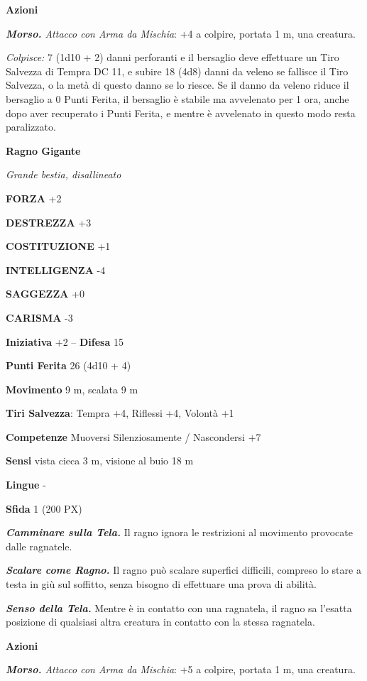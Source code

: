 \begin{multicols}{2}
	\textbf{Azioni}

	\textit{\textbf{Morso.} Attacco con Arma da Mischia}: +4 a colpire, portata 1 m, una creatura.

	\textit{Colpisce:} 7 (1d10 + 2) danni perforanti e il bersaglio deve effettuare un Tiro Salvezza di Tempra DC 11, e subire 18 (4d8) danni da veleno se fallisce il Tiro Salvezza, o la metà di questo danno se lo riesce. Se il danno da veleno riduce il bersaglio a 0 Punti Ferita, il bersaglio è stabile ma avvelenato per 1 ora, anche dopo aver recuperato i Punti Ferita, e mentre è avvelenato in questo modo resta paralizzato.

	\medskip\textbf{Ragno Gigante}

	\textit{Grande bestia, disallineato}

	\textbf{FORZA} +2

	\textbf{DESTREZZA} +3

	\textbf{COSTITUZIONE} +1

	\textbf{INTELLIGENZA} -4

	\textbf{SAGGEZZA} +0

	\textbf{CARISMA} -3

	\textbf{Iniziativa} +2 -- \textbf{Difesa} 15

	\textbf{Punti Ferita} 26 (4d10 + 4)

	\textbf{Movimento} 9 m, scalata 9 m

	\textbf{Tiri Salvezza}: Tempra +4, Riflessi +4, Volontà +1

	\textbf{Competenze} Muoversi Silenziosamente / Nascondersi +7

	\textbf{Sensi} vista cieca 3 m, visione al buio 18 m

	\textbf{Lingue} -

	\textbf{Sfida} 1 (200 PX)

	\textit{\textbf{Camminare sulla Tela.}} Il ragno ignora le restrizioni al movimento provocate dalle ragnatele.

	\textit{\textbf{Scalare come Ragno.}} Il ragno può scalare superfici difficili, compreso lo stare a testa in giù sul soffitto, senza bisogno di effettuare una prova di abilità.

	\textit{\textbf{Senso della Tela.}} Mentre è in contatto con una ragnatela, il ragno sa l'esatta posizione di qualsiasi altra creatura in contatto con la stessa ragnatela.

	\textbf{Azioni}

	\textit{\textbf{Morso.} Attacco con Arma da Mischia}: +5 a colpire, portata 1 m, una creatura.


\end{multicols}
